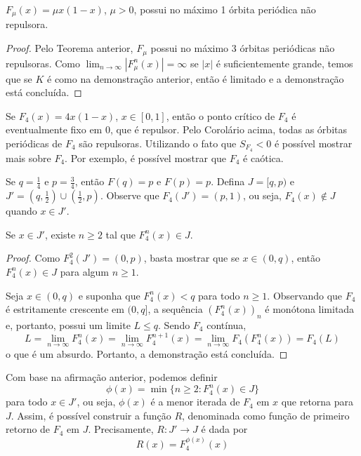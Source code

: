\begin{corollary}
$F_\mu(x) = \mu x(1-x)$, $\mu > 0$, possui no máximo 1 órbita periódica não repulsora.
\end{corollary}

\begin{proof}
Pelo Teorema anterior, $F_\mu$ possui no máximo 3 órbitas periódicas não repulsoras.  Como $\lim_{n \to\infty} |F^n_\mu(x)| = \infty$ se $|x|$ é suficientemente grande, temos que se $K$ é como na demonstração anterior, então é limitado e a demonstração está concluída.
\end{proof}

Se $F_4(x) = 4x(1-x)$, $x \in [0,1]$, então o ponto crítico de $F_4$ é eventualmente fixo em 0, que é repulsor. Pelo Corolário acima, todas as órbitas periódicas de $F_4$ são repulsoras. Utilizando o fato que $S_{F_4} < 0$ é possível mostrar mais sobre $F_4$. Por exemplo, é possível mostrar que $F_4$ é caótica. 

Se $q=\frac{1}{4}$ e $p=\frac{3}{4}$, então $F(q)=p$ e $F(p)=p$. Defina $J = [q, p)$ e $J' = \left( q,\frac{1}{2} \right) \cup \left( \frac{1}{2}, p \right)$. Observe que $F_4(J') = \left ( p ,1 \right )$, ou seja, $F_4(x) \notin J$ quando $x \in J'$.

\begin{affirmation}
Se $x \in J'$, existe $n \geq 2$ tal que $F_4^n(x) \in J$.
\end{affirmation}

\begin{proof}
Como $F_4^2(J') = (0, p)$, basta mostrar que se $x \in (0, q)$, então $F_4^n(x) \in J$ para algum $n \geq 1$.

Seja $x \in (0,q)$ e suponha que $F_4^n(x) < q$ para todo $n \geq 1$. Observando que $F_4$ é estritamente crescente em $(0,q]$, a sequência $(F_4^n(x))_n$ é monótona limitada e, portanto, possui um limite $L \leq q$. Sendo $F_4$ contínua,
$$L = \lim_{n \to \infty} F_4^n(x) = \lim_{n \to \infty} F_4^{n+1}(x) = \lim_{n \to \infty} F_4(F_4^n(x)) = F_4(L)$$
o que é um absurdo. Portanto, a demonstração está concluída.
\end{proof}

Com base na afirmação anterior, podemos definir
$$\phi(x) = \min \{ n \geq 2 : F_4^n(x) \in J \}$$
para todo $x \in J'$, ou seja, $\phi(x)$ é a menor iterada de $F_4$ em $x$ que retorna para $J$.  Assim, é possível construir a função $R$, denominada como função de primeiro retorno de $F_4$ em $J$. Precisamente, $R: J' \to J$ é dada por
$$R(x) = F_4^{\phi(x)}(x)$$


